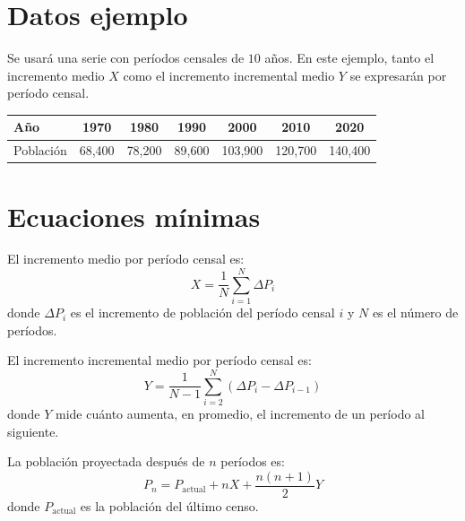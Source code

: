 \documentclass[12pt]{article}
\begin{document}

\section{Datos ejemplo}
Se usará una serie con períodos censales de $10$ años. En este ejemplo, tanto el incremento medio $X$ como el incremento incremental medio $Y$ se expresarán por período censal.

\begin{center}
\begin{tabular}{lcccccc}
\toprule
Año & 1970 & 1980 & 1990 & 2000 & 2010 & 2020 \\
\midrule
Población & 68,400 & 78,200 & 89,600 & 103,900 & 120,700 & 140,400 \\
\bottomrule
\end{tabular}
\end{center}

\section{Ecuaciones mínimas}
El incremento medio por período censal es:
\begin{equation}
X=\frac{1}{N}\sum_{i=1}^{N}\Delta P_i
\end{equation}
donde $\Delta P_i$ es el incremento de población del período censal $i$ y $N$ es el número de períodos.

El incremento incremental medio por período censal es:
\begin{equation}
Y=\frac{1}{N-1}\sum_{i=2}^{N}\left(\Delta P_i-\Delta P_{i-1}\right)
\end{equation}
donde $Y$ mide cuánto aumenta, en promedio, el incremento de un período al siguiente.

La población proyectada después de $n$ períodos es:
\begin{equation}
P_n=P_{\text{actual}}+nX+\frac{n(n+1)}{2}Y
\end{equation}
donde $P_{\text{actual}}$ es la población del último censo.

\end{document}
